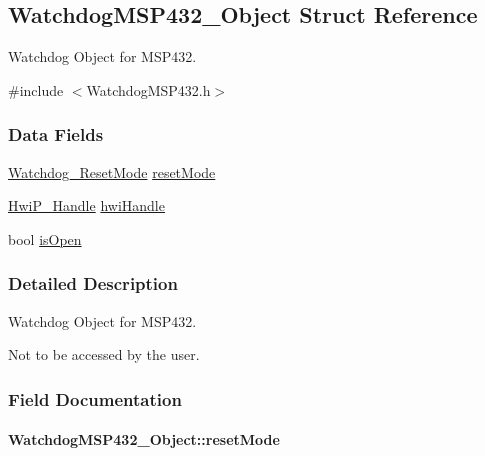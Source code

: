 \subsection{Watchdog\+M\+S\+P432\+\_\+\+Object Struct Reference}
\label{struct_watchdog_m_s_p432___object}


Watchdog Object for M\+S\+P432.  




{\ttfamily \#include $<$Watchdog\+M\+S\+P432.\+h$>$}

\subsubsection*{Data Fields}
\begin{DoxyCompactItemize}
\item 
\hyperlink{_watchdog_8h_ada0db7216129d7dad494bb0cd0169f88}{Watchdog\+\_\+\+Reset\+Mode} \hyperlink{struct_watchdog_m_s_p432___object_a23669cbdf9422b9ffa15830dde21a10d}{reset\+Mode}
\item 
\hyperlink{_hwi_p_8h_a7dd325ff62af296374efc6d317f5e368}{Hwi\+P\+\_\+\+Handle} \hyperlink{struct_watchdog_m_s_p432___object_a2ab0f5242ebff32a5b73f04245f44f94}{hwi\+Handle}
\item 
bool \hyperlink{struct_watchdog_m_s_p432___object_a8e1ce4085157c2a708fecb5a6479797f}{is\+Open}
\end{DoxyCompactItemize}


\subsubsection{Detailed Description}
Watchdog Object for M\+S\+P432. 

Not to be accessed by the user. 

\subsubsection{Field Documentation}
\paragraph[{reset\+Mode}]{ Watchdog\+M\+S\+P432\+\_\+\+Object\+::reset\+Mode}\label{struct_watchdog_m_s_p432___object_a23669cbdf9422b9ffa15830dde21a10d}
